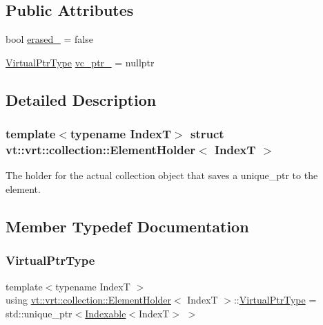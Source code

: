 \subsection*{Public Attributes}
\begin{DoxyCompactItemize}
\item 
bool \hyperlink{structvt_1_1vrt_1_1collection_1_1_element_holder_a25d5596b79044ad1d5b21c83820e0b1c}{erased\+\_\+} = false
\item 
\hyperlink{structvt_1_1vrt_1_1collection_1_1_element_holder_aab2fd054199e1fed22be78fa1969eb2c}{Virtual\+Ptr\+Type} \hyperlink{structvt_1_1vrt_1_1collection_1_1_element_holder_ad84006b095efa23b1b9513e5f31e1d33}{vc\+\_\+ptr\+\_\+} = nullptr
\end{DoxyCompactItemize}


\subsection{Detailed Description}
\subsubsection*{template$<$typename IndexT$>$\newline
struct vt\+::vrt\+::collection\+::\+Element\+Holder$<$ Index\+T $>$}

The holder for the actual collection object that saves a unique\+\_\+ptr to the element. 

\subsection{Member Typedef Documentation}
\mbox{\label{structvt_1_1vrt_1_1collection_1_1_element_holder_aab2fd054199e1fed22be78fa1969eb2c}} 
\subsubsection{\texorpdfstring{Virtual\+Ptr\+Type}{VirtualPtrType}}
{\footnotesize\ttfamily template$<$typename IndexT $>$ \\
using \hyperlink{structvt_1_1vrt_1_1collection_1_1_element_holder}{vt\+::vrt\+::collection\+::\+Element\+Holder}$<$ IndexT $>$\+::\hyperlink{structvt_1_1vrt_1_1collection_1_1_element_holder_aab2fd054199e1fed22be78fa1969eb2c}{Virtual\+Ptr\+Type} =  std\+::unique\+\_\+ptr$<$\hyperlink{structvt_1_1vrt_1_1collection_1_1_indexable}{Indexable}$<$IndexT$>$ $>$}




